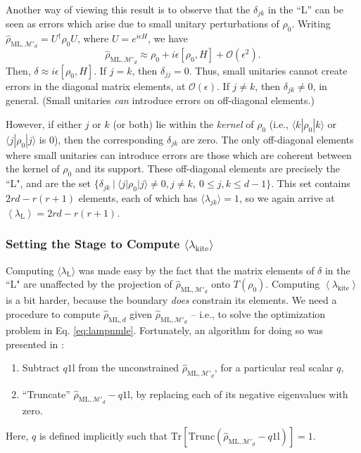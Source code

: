\documentclass[aps,pra, twocolumn]{revtex4-1}
\newcommand{\M}{\mathcal{M}}
\newcommand{\Tr}{\mathrm{Tr}}
\newcommand{\Id}{\mathbb{I}}
\newcommand{\expect}[1]{\ensuremath{\left\langle#1\right\rangle}}
\def\Id{1\!\mathrm{l}}
\newcommand{\rhohat}{\hat{\rho}}
\newcommand{\rhoML}[1]{\rhohat_{\scriptscriptstyle{\mathrm{ML},#1}}}
\begin{document}
Another way of viewing this result is to observe that the $\delta_{jk}$ in the ``L'' can be seen as errors which arise due to small unitary perturbations of $\rho_{0}$. Writing $\rhoML{\M'_{d}} = U^{\dagger}\rho_{0}U$, where $U=e^{i\epsilon H}$, we have
\[\rhoML{\M'_{d}} \approx \rho_{0} + i\epsilon [\rho_{0},H]+\mathcal{O}(\epsilon^{2}).\]
Then, $\delta \approx i\epsilon [\rho_{0},H]$.
If $j = k$, then $\delta_{jj} = 0$. Thus, small unitaries cannot create errors in the diagonal matrix elements, at $\mathcal{O}(\epsilon)$. If $j \neq k$, then $\delta_{jk} \neq 0$, in general. (Small unitaries \emph{can} introduce errors on off-diagonal elements.)

However, if either $j$ or $k$ (or both) lie within the \emph{kernel} of $\rho_{0}$ (i.e., $\langle k | \rho_{0}| k \rangle$ or $\langle j|\rho_{0}|j\rangle$ is 0), then the corresponding $\delta_{jk}$ are zero. The only off-diagonal elements where small unitaries can introduce errors are those which are coherent between the kernel of $\rho_{0}$ and its support. These off-diagonal elements are precisely the ``L", and are  the set $\{\delta_{jk}~|~\langle j | \rho_{0}|j\rangle \neq 0, j\neq k, ~ 0 \leq j,k \leq d - 1\}$. This set contains $2rd - r(r+1)$ elements, each of which has $\langle \lambda_{jk}\rangle = 1$, so we again arrive at $\expect{\lambda_{\mathrm{L}}} = 2rd - r(r+1)$.

\subsubsection{Setting the Stage to Compute $\langle \lambda_\mathrm{kite}\rangle$}

Computing $\langle \lambda_{\mathrm{L}}\rangle$ was made easy by the fact that the matrix elements of $\delta$ in the ``L" are unaffected by the projection of $\rhoML{\M'_{d}}$ onto $T(\rho_{0})$. Computing $\expect{\lambda_{\mathrm{kite}}}$ is a bit harder, because the boundary \emph{does} constrain its elements. We need a procedure to compute $\rhoML{d}$ given $\rhoML{\M'_{d}}$ -- i.e., to solve the optimization problem in Eq. \eqref{eq:lampnmle}.  Fortunately, an algorithm for doing so was presented in \cite{Smolin2012}:
\begin{enumerate}[noitemsep]
\item Subtract $q\Id$ from the unconstrained $\rhoML{\M'_{d}}$, for a particular real scalar $q$,
\item ``Truncate'' $\rhoML{\M'_{d}}-q\Id$, by replacing each of its negative eigenvalues with zero.
\end{enumerate}
Here, $q$ is defined implicitly such that $\Tr\left[ \mathrm{Trunc}(\rhoML{\M'_{d}}-q\Id)\right] = 1$.
\end{document}
